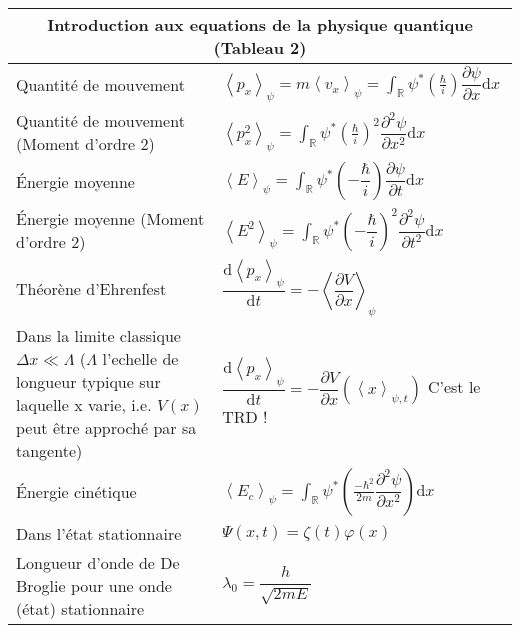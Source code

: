 \documentclass[10pt,a4paper,titlepage,landscape]{article}
\renewcommand{\d}
{
    \mathrm{d}
}
\newcommand*{\dv}[2]
{
    \dfrac{\d#1}{\d#2}
}
\newcommand*{\dpv}[2]
{
    \dfrac{\partial#1}{\partial#2}
}
\newcommand*{\ddpv}[2]
{
    \dfrac{\partial^2#1}{\partial{#2}^2}
}
\renewcommand{\arraystretch}{2}
\newcommand{\av}[2]
{
    \left\langle#1\right\rangle_{#2}
}
\newcommand{\rint}
{
    \int_{\mathbb{R}}
}
\renewcommand{\phi}
{
    \varphi
}
\begin{document}
\newpage 
\begin{table}[H]
    \centering
    \renewcommand{\arraystretch}{1.5} %
    \setlength{\tabcolsep}{8pt} %
    \begin{tabular}{@{}|p{9cm}|p{10cm}@{}|}

        \multicolumn{2}{c}{\textbf{Introduction aux equations de la physique quantique (Tableau 2)}} \\ \hline


    Quantité de mouvement & $\displaystyle \av{p_x}{\psi}=m\av{v_x}{\psi}=\rint \psi^* \left(\frac{\hbar}{i}\right) \dpv{\psi}{x}\d x$ \\ \hline 
    Quantité de mouvement (Moment d'ordre 2) & $\displaystyle \av{p_x^2}{\psi}=\rint \psi^* \left(\frac{\hbar}{i}\right)^2 \ddpv{\psi}{x}\d x$ \\ \hline
    Énergie moyenne & $\displaystyle \av{E}{\psi} = \rint \psi^* \left(-\dfrac{\hbar}{i}\right)\dpv{\psi}{t}\d x$ \\ \hline
    Énergie moyenne (Moment d'ordre 2) & $\displaystyle \av{E^2}{\psi} = \rint \psi^* \left(-\dfrac{\hbar}{i}\right)^2\ddpv{\psi}{t}\d x$ \\ \hline

    Théorène d'Ehrenfest & $\dv{\av{p_x}{\psi}}{t} = -\av{\dpv{V}{x}}{\psi}$ \\ \hline
    Dans la limite classique $\Delta x \ll \Lambda $ ($\Lambda$ l'echelle de longueur typique sur laquelle x varie, i.e. $V(x)$ peut être approché par sa tangente) & $\dv{\av{p_x}{\psi}}{t} = -\dpv{V}{x} \left(\av{x}{\psi, t}\right)$ C'est le TRD ! \\ \hline
    Énergie cinétique & $\displaystyle \av{E_c}{\psi} = \rint \psi^* \left(\frac{-\hbar^2}{2m}\ddpv{\psi}{x}\right) \d x $\\ \hline
    Dans l'état stationnaire & $\Psi(x,t) = \zeta(t)\phi(x) $ \\ \hline
    Longueur d'onde de De Broglie pour une onde (état) stationnaire & $\lambda_0 = \dfrac{h}{\sqrt{2mE}}$ \\ \hline


\end{tabular}
\end{table}
\end{document}

